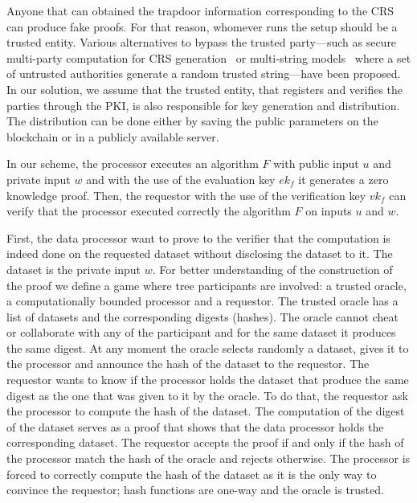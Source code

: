 Anyone that can obtained the trapdoor information corresponding to the CRS can produce fake proofs. For that reason, whomever runs the setup should be a trusted entity. Various alternatives to bypass the trusted party---such as secure multi-party computation for CRS generation~\cite{zcash_mpc} or multi-string models~\cite{groth2014cryptography} where a set of untrusted authorities generate a random trusted string---have been proposed. In our solution, we assume that the trusted entity, that registers and verifies the parties through the PKI, is also responsible for key generation and distribution. The distribution can be done either by saving the public parameters on the blockchain or in a publicly available server.

In our scheme, the processor executes an algorithm $F$ with public input $u$ and private input $w$ and with the use of the evaluation key $ek_f$ it generates a zero knowledge proof. Then, the requestor with the use of the verification key $vk_f$ can verify that the processor executed correctly the algorithm $F$ on inputs $u$ and $w$.

First, the data processor want to prove to the verifier that the computation is indeed done on the requested dataset without disclosing the dataset to it. The dataset is the private input $w$. For better understanding of the construction of the proof we define a game where tree participants are involved: a trusted oracle, a  computationally bounded processor and a requestor. The trusted oracle has a list of datasets and the corresponding digests (hashes). The oracle cannot cheat or collaborate with any of the participant and for the same dataset it produces the same digest. At any moment the oracle selects randomly a dataset, gives it to the processor and announce the hash of the dataset to the requestor. The requestor wants to know if the processor holds the dataset that produce the same digest as the one that was given to it by the oracle. To do that, the requestor ask the processor to compute the hash of the dataset. The computation of the digest of the dataset serves as a proof that shows that the data processor holds the corresponding dataset. The requestor accepts the proof if and only if the hash of the processor match the hash of the oracle and rejects otherwise. The processor is forced to correctly compute the hash of the dataset as it is the only way to convince the requestor; hash functions are one-way and the oracle is trusted.

